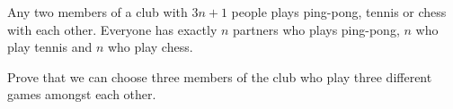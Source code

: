 Any two members of a club with $3n+1$ people plays ping-pong, tennis or chess with each other. Everyone has exactly $n$ partners who plays ping-pong, $n$ who play tennis and $n$ who play chess.

Prove that we can choose three members of the club who play three different games amongst each other.